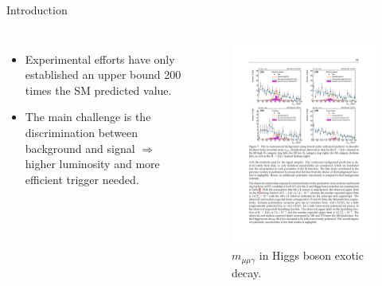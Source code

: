 \documentclass[aspectratio = 1610, xcolor = dvipsnames]{beamer}
\newcommand{\red}{\textcolor{unipd}}
\begin{document}
	
    \begin{frame}[t]{Introduction}

        \begin{columns}[c]


            \begin{itemize}
                \item Experimental efforts have only established an \red{upper bound} 200 times the SM predicted value.
                \item The main challenge is the \red{discrimination} between background and signal $\Rightarrow$ higher luminosity and \red{more efficient trigger} needed.
            \end{itemize}
		

            \begin{figure}[c]
                \centering
                \includegraphics[width=1\textwidth]{images/results-H.pdf}
                \caption{$m_{\mu\mu\gamma}$ in Higgs boson exotic decay\footnotemark.
                \label{im:results-H}}
            \end{figure}


\end{columns}
\end{frame}
\end{document}
